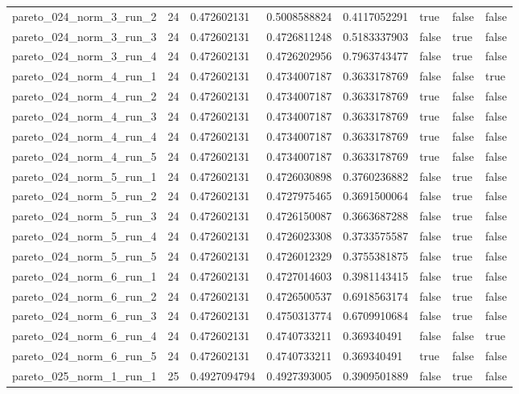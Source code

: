 \begin{tabular}{@{}llllllll@{}}
pareto\_024\_norm\_3\_run\_2 & 24 & 0.472602131 & 0.5008588824 & 0.4117052291 & true & false & false \\
pareto\_024\_norm\_3\_run\_3 & 24 & 0.472602131 & 0.4726811248 & 0.5183337903 & false & true & false \\
pareto\_024\_norm\_3\_run\_4 & 24 & 0.472602131 & 0.4726202956 & 0.7963743477 & false & true & false \\
pareto\_024\_norm\_4\_run\_1 & 24 & 0.472602131 & 0.4734007187 & 0.3633178769 & false & false & true \\
pareto\_024\_norm\_4\_run\_2 & 24 & 0.472602131 & 0.4734007187 & 0.3633178769 & true & false & false \\
pareto\_024\_norm\_4\_run\_3 & 24 & 0.472602131 & 0.4734007187 & 0.3633178769 & true & false & false \\
pareto\_024\_norm\_4\_run\_4 & 24 & 0.472602131 & 0.4734007187 & 0.3633178769 & true & false & false \\
pareto\_024\_norm\_4\_run\_5 & 24 & 0.472602131 & 0.4734007187 & 0.3633178769 & true & false & false \\
pareto\_024\_norm\_5\_run\_1 & 24 & 0.472602131 & 0.4726030898 & 0.3760236882 & false & true & false \\
pareto\_024\_norm\_5\_run\_2 & 24 & 0.472602131 & 0.4727975465 & 0.3691500064 & false & true & false \\
pareto\_024\_norm\_5\_run\_3 & 24 & 0.472602131 & 0.4726150087 & 0.3663687288 & false & true & false \\
pareto\_024\_norm\_5\_run\_4 & 24 & 0.472602131 & 0.4726023308 & 0.3733575587 & false & true & false \\
pareto\_024\_norm\_5\_run\_5 & 24 & 0.472602131 & 0.4726012329 & 0.3755381875 & false & true & false \\
pareto\_024\_norm\_6\_run\_1 & 24 & 0.472602131 & 0.4727014603 & 0.3981143415 & false & true & false \\
pareto\_024\_norm\_6\_run\_2 & 24 & 0.472602131 & 0.4726500537 & 0.6918563174 & false & true & false \\
pareto\_024\_norm\_6\_run\_3 & 24 & 0.472602131 & 0.4750313774 & 0.6709910684 & false & true & false \\
pareto\_024\_norm\_6\_run\_4 & 24 & 0.472602131 & 0.4740733211 & 0.369340491 & false & false & true \\
pareto\_024\_norm\_6\_run\_5 & 24 & 0.472602131 & 0.4740733211 & 0.369340491 & true & false & false \\
pareto\_025\_norm\_1\_run\_1 & 25 & 0.4927094794 & 0.4927393005 & 0.3909501889 & false & true & false \\

\end{tabular}
